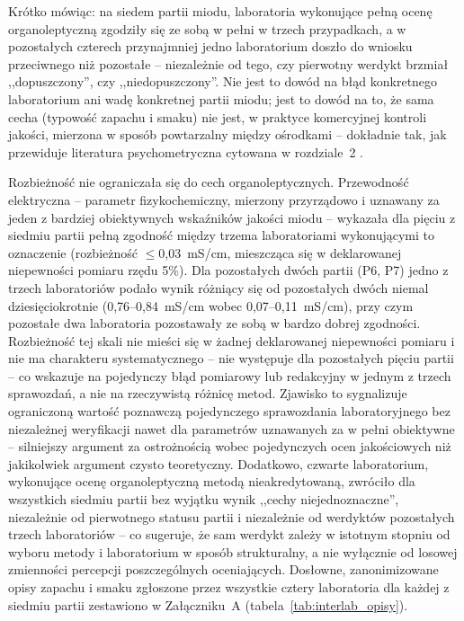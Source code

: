 \documentclass[12pt,a4paper]{article}
\begin{document}
Krótko mówiąc: na siedem partii miodu, laboratoria wykonujące pełną ocenę
organoleptyczną zgodziły się ze sobą w pełni w trzech przypadkach, a w pozostałych
czterech przynajmniej jedno laboratorium doszło do wniosku przeciwnego niż pozostałe --
niezależnie od tego, czy pierwotny werdykt brzmiał ,,dopuszczony'', czy ,,niedopuszczony''.
Nie jest to dowód na błąd konkretnego laboratorium ani wadę konkretnej partii miodu;
jest to dowód na to, że sama cecha (typowość zapachu i smaku) nie jest, w praktyce
komercyjnej kontroli jakości, mierzona w sposób powtarzalny między ośrodkami -- dokładnie
tak, jak przewiduje literatura psychometryczna cytowana w rozdziale~2
\cite{bartoshuk2003labeled,hodgson2009concordance,sipos2021panel}.

Rozbieżność nie ograniczała się do cech organoleptycznych. Przewodność elektryczna --
parametr fizykochemiczny, mierzony przyrządowo i uznawany za jeden z bardziej
obiektywnych wskaźników jakości miodu -- wykazała dla pięciu z siedmiu partii pełną
zgodność między trzema laboratoriami wykonującymi to oznaczenie (rozbieżność
$\leq$0,03~mS/cm, mieszcząca się w deklarowanej niepewności pomiaru rzędu 5\%). Dla
pozostałych dwóch partii (P6, P7) jedno z trzech laboratoriów podało wynik różniący
się od pozostałych dwóch niemal dziesięciokrotnie (0,76--0,84~mS/cm wobec
0,07--0,11~mS/cm), przy czym pozostałe dwa laboratoria pozostawały ze sobą w bardzo
dobrej zgodności. Rozbieżność tej skali nie mieści się w żadnej deklarowanej
niepewności pomiaru i nie ma charakteru systematycznego -- nie występuje dla
pozostałych pięciu partii -- co wskazuje na pojedynczy błąd pomiarowy lub redakcyjny w
jednym z trzech sprawozdań, a nie na rzeczywistą różnicę metod. Zjawisko to sygnalizuje
ograniczoną wartość poznawczą pojedynczego sprawozdania laboratoryjnego bez
niezależnej weryfikacji nawet dla parametrów uznawanych za w pełni obiektywne --
silniejszy argument za ostrożnością wobec pojedynczych ocen jakościowych niż
jakikolwiek argument czysto teoretyczny. Dodatkowo, czwarte laboratorium, wykonujące
ocenę organoleptyczną metodą nieakredytowaną, zwróciło dla wszystkich siedmiu partii
bez wyjątku wynik ,,cechy niejednoznaczne'', niezależnie od pierwotnego statusu partii i
niezależnie od werdyktów pozostałych trzech laboratoriów -- co sugeruje, że sam werdykt
zależy w istotnym stopniu od wyboru metody i laboratorium w sposób strukturalny, a nie
wyłącznie od losowej zmienności percepcji poszczególnych oceniających. Dosłowne,
zanonimizowane opisy zapachu i smaku zgłoszone przez wszystkie cztery laboratoria dla
każdej z siedmiu partii zestawiono w Załączniku~A (tabela~\ref{tab:interlab_opisy}).
\end{document}
